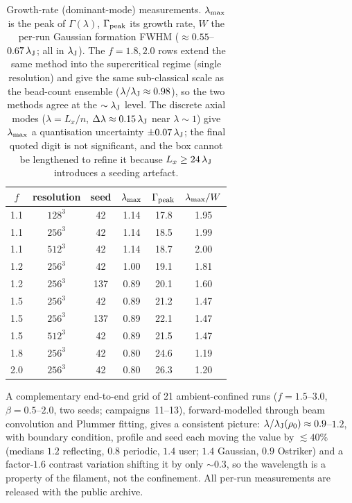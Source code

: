 \documentclass[usenatbib,twoside,twocolumn]{mnras}
\begin{document}
\begin{table}
\caption{Growth-rate (dominant-mode) measurements. $\lambda_{\rm max}$ is the peak of $\Gamma(\lambda)$, $\Gamma_{\rm peak}$ its growth rate, $W$ the per-run Gaussian formation FWHM ($\approx0.55$--$0.67\,\lambda_{\rm J}$; all in $\lambda_{\rm J}$). The $f=1.8,2.0$ rows extend the same method into the supercritical regime (single resolution) and give the same sub-classical scale as the bead-count ensemble ($\lambda/\lambda_{\rm J}\approx0.98$), so the two methods agree at the $\sim\lambda_{\rm J}$ level. The discrete axial modes ($\lambda=L_x/n$, $\Delta\lambda\approx0.15\,\lambda_{\rm J}$ near $\lambda\sim1$) give $\lambda_{\rm max}$ a quantisation uncertainty $\pm0.07\,\lambda_{\rm J}$; the final quoted digit is not significant, and the box cannot be lengthened to refine it because $L_x\geq24\,\lambda_{\rm J}$ introduces a seeding artefact.}
\label{tab:wave}
\footnotesize
\setlength{\tabcolsep}{4pt}
\begin{tabular}{cccccc}
\toprule
$f$ & resolution & seed & $\lambda_{\rm max}$ & $\Gamma_{\rm peak}$ & $\lambda_{\rm max}/W$ \\
\midrule
1.1 & $128^3$ & 42  & 1.14 & 17.8 & 1.95 \\
1.1 & $256^3$ & 42  & 1.14 & 18.5 & 1.99 \\
1.1 & $512^3$ & 42  & 1.14 & 18.7 & 2.00 \\
1.2 & $256^3$ & 42  & 1.00 & 19.1 & 1.81 \\
1.2 & $256^3$ & 137 & 0.89 & 20.1 & 1.60 \\
1.5 & $256^3$ & 42  & 0.89 & 21.2 & 1.47 \\
1.5 & $256^3$ & 137 & 0.89 & 22.1 & 1.47 \\
1.5 & $512^3$ & 42  & 0.89 & 21.5 & 1.47 \\
1.8 & $256^3$ & 42  & 0.80 & 24.6 & 1.19 \\
2.0 & $256^3$ & 42  & 0.80 & 26.3 & 1.20 \\
\bottomrule
\end{tabular}
\end{table}

A complementary end-to-end grid of 21 ambient-confined runs ($f=1.5$--$3.0$, $\beta=0.5$--$2.0$, two seeds; campaigns~11--13), forward-modelled through beam convolution and Plummer fitting, gives a consistent picture: $\lambda/\lambda_{\rm J}(\rho_0)\approx0.9$--$1.2$, with boundary condition, profile and seed each moving the value by $\lesssim40\%$ (medians $1.2$ reflecting, $0.8$ periodic, $1.4$ user; $1.4$ Gaussian, $0.9$ Ostriker) and a factor-$1.6$ contrast variation shifting it by only $\sim0.3$, so the wavelength is a property of the filament, not the confinement. All per-run measurements are released with the public archive.
\end{document}
